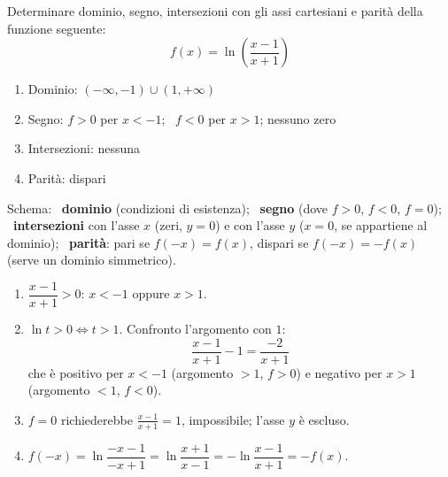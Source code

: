 \begin{question}[ID=1.15, subtitle={Studio di una funzione logaritmica composta}, difficulty=difficile, tags={funzioni, studio di funzione, logaritmi, parità}]
Determinare dominio, segno, intersezioni con gli assi cartesiani e parità della funzione seguente:
\begin{equation*}
    f(x)=\ln\left(\frac{x-1}{x+1}\right)
\end{equation*}
\begin{solution}
\begin{enumerate}
    \item Dominio: $(-\infty,-1)\cup(1,+\infty)$
    \item Segno: $f>0$ per $x<-1$; \ $f<0$ per $x>1$; nessuno zero
    \item Intersezioni: nessuna
    \item Parità: dispari
\end{enumerate}
\end{solution}
\begin{explanation}
Schema: \ \textbf{dominio} (condizioni di esistenza); \ \textbf{segno} (dove $f>0$, $f<0$, $f=0$); \ \textbf{intersezioni} con l'asse $x$ (zeri, $y=0$) e con l'asse $y$ ($x=0$, se appartiene al dominio); \ \textbf{parità}: pari se $f(-x)=f(x)$, dispari se $f(-x)=-f(x)$ (serve un dominio simmetrico).
\begin{enumerate}
    \item $\dfrac{x-1}{x+1}>0$: $x<-1$ oppure $x>1$.
    \item $\ln t>0 \iff t>1$. Confronto l'argomento con $1$:
    \[ \dfrac{x-1}{x+1}-1=\dfrac{-2}{x+1} \]
    che è positivo per $x<-1$ (argomento $>1$, $f>0$) e negativo per $x>1$ (argomento $<1$, $f<0$).
    \item $f=0$ richiederebbe $\tfrac{x-1}{x+1}=1$, impossibile; l'asse $y$ è escluso.
    \item $f(-x)=\ln\dfrac{-x-1}{-x+1}=\ln\dfrac{x+1}{x-1}=-\ln\dfrac{x-1}{x+1}=-f(x)$.
\end{enumerate}
\end{explanation}
\end{question}



